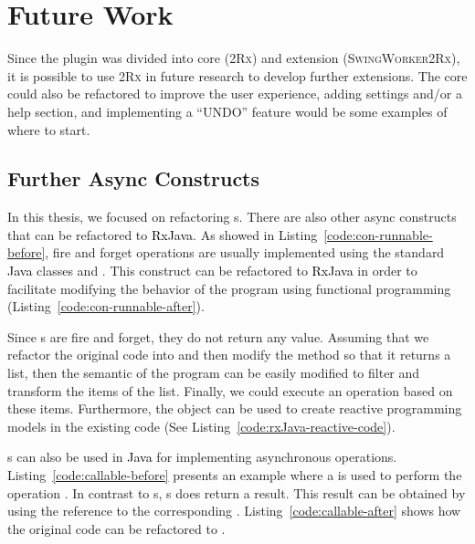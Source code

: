 \documentclass[type=bsc,accentcolor=tud9c]{tudthesis}
\newcommand{\framework}[1]{\textcolor{black}{#1}}
\newcommand{\toolcore}{\textsc{2Rx}}
\newcommand{\toolextension}{\textsc{SwingWorker2Rx}}
\begin{document}
\section{Future Work}

Since the plugin was divided into core (\toolcore{}) and extension (\toolextension{}), it is possible to use \toolcore{} in future research to develop further extensions. The core could also be refactored to improve the user experience, adding settings and/or a help section, and implementing a ``UNDO'' feature would be some examples of where to start.

\subsection{Further Async Constructs}
In this thesis, we focused on refactoring s. There are also other async constructs that can be refactored to \framework{RxJava}. As showed in Listing~\ref{code:con-runnable-before}, fire and forget operations are usually implemented using the standard \framework{Java} classes  and . This construct can be refactored to \framework{RxJava} in order to facilitate modifying the behavior of the program using functional programming (Listing~\ref{code:con-runnable-after}).

Since s are fire and forget, they do not return any value. Assuming that we refactor the original code into  and then modify the method  so that it returns a list, then the semantic of the program can be easily modified to filter and transform the items of the list. Finally, we could execute an operation based on these items. Furthermore, the  object can be used to create reactive programming models in the existing code (See Listing~\ref{code:rxJava-reactive-code}).



s can also be used in \framework{Java} for implementing asynchronous operations. Listing~\ref{code:callable-before} presents an example where a  is used to perform the operation . In contrast to s, s does return a result. This result can be obtained by using the reference to the corresponding . Listing~\ref{code:callable-after} shows how the original code can be refactored to .


\end{document}
